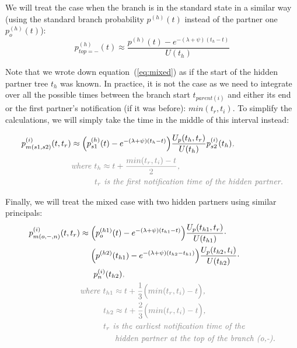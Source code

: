\documentclass[a4paper,10pt]{article}
\begin{document}
We will treat the case when the branch is in the standard state in a similar way (using the standard branch probability $p^{(h)}(t)$ instead of the partner one $p_o^{(h)}(t)$):
\begin{equation}
p_{top=-}^{(h)}(t) \approx \frac{p^{(h)}(t) -e^{-(\lambda + \psi)(t_{h} - t)}}{U(t_{h})}
\end{equation}


Note that we wrote down equation~(\ref{eq:mixed}) as if the start of the hidden partner tree $t_h$ was known. In practice, it is not the case as we need to integrate over all the possible times between the branch start $t_{parent(i)}$ and either its end or the first partner's notification (if it was before): $min(t_r,t_i)$. To simplify the calculations, we will simply take the time in the middle of this interval instead: 

\begin{equation}
\begin{split}
p_{m(s1,s2)}^{(i)}(t,t_r) &\approx \Big(p_{s1}^{(h)}(t) -e^{-(\lambda + \psi)(t_{h} - t)}\Big)\frac{U_p(t_h,t_r)}{U(t_{h})}p_{s2}^{(i)}(t_h)\textit{\color{gray},}\\
&\textit{\color{gray}where $t_h \approx t + \frac{min(t_r, t_i) - t}{2}$,}\\
&\textit{\color{gray}~~~~~~~~$t_r$ is the first notification time of the hidden partner.}\\
\end{split}\label{eq:p_mixed}
\end{equation}


Finally, we will treat the mixed case with two hidden partners using similar principals:
\begin{equation}
\begin{split}
p_{m(o,-,n)}^{(i)}(t,t_r) &\approx \Big(p_{o}^{(h1)}(t) -e^{-(\lambda + \psi)(t_{h1} - t)}\Big)\frac{U_p(t_{h1},t_{r})}{U(t_{h1})}\cdot
\\
&~~~~\Big(p^{(h2)}(t_{h1}) -e^{-(\lambda + \psi)(t_{h2} - t_{h1})}\Big)\frac{U_p(t_{h2},t_{i})}{U(t_{h2})}\cdot
\\
&~~~~~p_n^{(i)}(t_{h2})\textit{\color{gray},}\\
&\textit{\color{gray}where $t_{h1} \approx t + \frac{1}{3}\Big(min(t_{r}, t_i) - t\Big)$,}\\
&\textit{\color{gray}~~~~~~~~$t_{h2} \approx t + \frac{2}{3}\Big(min(t_{r}, t_i) - t\Big)$,}\\
&\textit{\color{gray}~~~~~~~~$t_{r}$ is the earliest notification time of the }\\
&\textit{\color{gray}~~~~~~~~~~~~hidden partner at the top of the branch (o,-).}\\
\end{split}\label{eq:p_mixed_mixed}
\end{equation}
\end{document}
